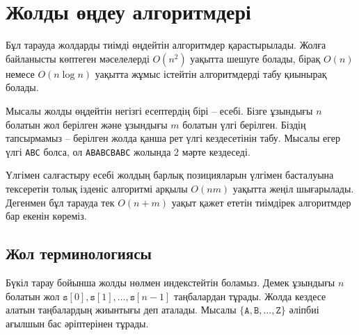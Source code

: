 \chapter{Жолды өңдеу алгоритмдері}

Бұл тарауда жолдарды тиімді өңдейтін алгоритмдер
қарастырылады. Жолға байланысты көптеген мәселелерді
$O(n^2)$ уақытта шешуге  болады, бірақ 
$O(n)$ немесе $O(n \log n)$ уақытта жұмыс істейтін
алгоритмдерді табу қиынырақ болады. 




Мысалы жолды өңдейтін негізгі есептердің бірі 
--  есебі. Бізге ұзындығы 
$n$ болатын жол берілген және ұзындығы $m$ болатын
үлгі берілген. Біздің тапсырмамыз -- берілген жолда 
қанша рет үлгі кездесетінін табу.
Мысалы егер үлгі \texttt{ABC} болса, ол 
\texttt{ABABCBABC} жолында 2 мәрте кездеседі. 


Үлгімен салғастыру есебі 
жолдың барлық позицияларын үлгімен басталуына тексеретін
толық ізденіс алгоритмі арқылы $O(nm)$ уақытта жеңіл 
шығарылады. Дегенмен бұл тарауда тек $O(n+m)$ уақыт
қажет ететін тиімдірек алгоритмдер бар екенін көреміз.



\section{Жол терминологиясы}


Бүкіл тарау бойынша жолды нөлмен индекстейтін боламыз. 
Демек ұзындығы $n$ болатын жол 
$\texttt{s}[0],\texttt{s}[1],\ldots,\texttt{s}[n-1]$
таңбалардан тұрады. Жолда кездесе алатын 
таңбалардың жиынтығы  деп аталады.
Мысалы 
$\{\texttt{A},\texttt{B},\ldots,\texttt{Z}\}$
әліпбиі ағылшын бас әріптерінен тұрады. 

